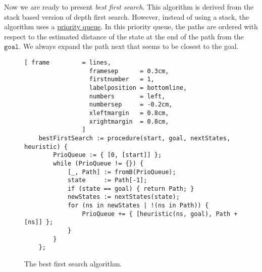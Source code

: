 Now we are ready to present \emph{\color{blue}best first search}.  This algorithm is derived from the stack based
version of depth first search.  However, instead of using a stack, the algorithm uses a 
\href{https://en.wikipedia.org/wiki/Priority_queue}{priority queue}.  In this priority queue, the paths are
ordered with respect to the estimated distance of the state at the end of the path from the $\mathtt{goal}$.
We always expand the path next that seems to be closest to the goal.  

\begin{figure}[!ht]
\centering
\begin{Verbatim}[ frame         = lines, 
                  framesep      = 0.3cm, 
                  firstnumber   = 1,
                  labelposition = bottomline,
                  numbers       = left,
                  numbersep     = -0.2cm,
                  xleftmargin   = 0.8cm,
                  xrightmargin  = 0.8cm,
                ]
    bestFirstSearch := procedure(start, goal, nextStates, heuristic) {
        PrioQueue := { [0, [start]] };
        while (PrioQueue != {}) {
            [_, Path] := fromB(PrioQueue);
            state     := Path[-1];
            if (state == goal) { return Path; }
            newStates := nextStates(state);
            for (ns in newStates | !(ns in Path)) {
                PrioQueue += { [heuristic(ns, goal), Path + [ns]] };
            }
        }
    };
\end{Verbatim}
\vspace*{-0.3cm}
\caption{The best first search algorithm.}
\label{fig:best-first-search.stlx}
\end{figure}

